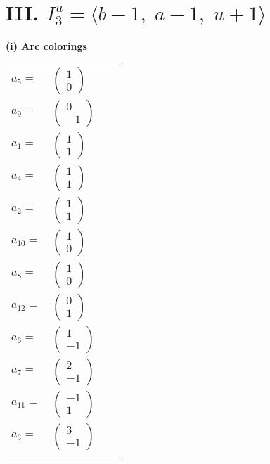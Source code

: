 \documentclass[1p]{elsarticle_modified}
\theoremstyle{definition}
\begin{document}
\centering \section*{III. $I^u_{3}= \langle b-1,\;a-1,\;u+1 \rangle$}
\flushleft \textbf{(i) Arc colorings}\\
\begin{tabular}{m{7pt} m{180pt} m{7pt} m{180pt} }
\flushright $a_{5}=$&$\begin{pmatrix}1\\0\end{pmatrix}$ \\
\flushright $a_{9}=$&$\begin{pmatrix}0\\-1\end{pmatrix}$ \\
\flushright $a_{1}=$&$\begin{pmatrix}1\\1\end{pmatrix}$ \\
\flushright $a_{4}=$&$\begin{pmatrix}1\\1\end{pmatrix}$ \\
\flushright $a_{2}=$&$\begin{pmatrix}1\\1\end{pmatrix}$ \\
\flushright $a_{10}=$&$\begin{pmatrix}1\\0\end{pmatrix}$ \\
\flushright $a_{8}=$&$\begin{pmatrix}1\\0\end{pmatrix}$ \\
\flushright $a_{12}=$&$\begin{pmatrix}0\\1\end{pmatrix}$ \\
\flushright $a_{6}=$&$\begin{pmatrix}1\\-1\end{pmatrix}$ \\
\flushright $a_{7}=$&$\begin{pmatrix}2\\-1\end{pmatrix}$ \\
\flushright $a_{11}=$&$\begin{pmatrix}-1\\1\end{pmatrix}$ \\
\flushright $a_{3}=$&$\begin{pmatrix}3\\-1\end{pmatrix}$\\&\end{tabular}
\end{document}
